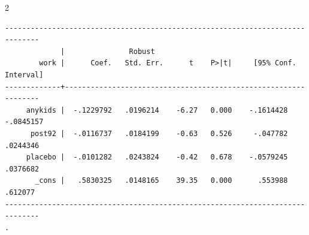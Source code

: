 \documentclass{article}
\newenvironment{changemargin}[2]{%
\begin{list}{}{%
\setlength{\topsep}{0pt}%
\setlength{\leftmargin}{#1}%
\setlength{\rightmargin}{#2}%
\setlength{\listparindent}{\parindent}%
\setlength{\itemindent}{\parindent}%
\setlength{\parsep}{\parskip}%
}%
\item[]}{\end{list}}
\begin{document}
\begin{changemargin}{-0.5in}{-0.5in}
\begin{multicols}{2}
\begin{verbatim}
------------------------------------------------------------------------------
             |               Robust
        work |      Coef.   Std. Err.      t    P>|t|     [95% Conf. Interval]
-------------+----------------------------------------------------------------
     anykids |  -.1229792   .0196214    -6.27   0.000    -.1614428   -.0845157
      post92 |  -.0116737   .0184199    -0.63   0.526     -.047782    .0244346
     placebo |  -.0101282   .0243824    -0.42   0.678    -.0579245    .0376682
       _cons |   .5830325   .0148165    39.35   0.000      .553988     .612077
------------------------------------------------------------------------------
. 
\end{verbatim}

\end{multicols}
\end{changemargin}
\end{document}
